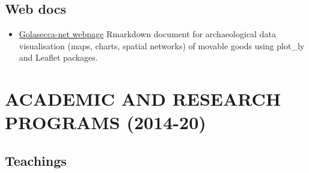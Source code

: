 \documentclass[11pt]{report} %
\begin{document}
\subsection*{Web docs}

\begin{itemize}
\item \href{https://zoometh.github.io/golasecca/}{Golasecca-net webpage} Rmarkdown document for archaeological data visualisation (maps, charts, spatial networks) of movable goods using plot\_ly and Leaflet packages.
\end{itemize}

\section*{ACADEMIC AND RESEARCH PROGRAMS (2014-20)}

\subsection*{Teachings}
\end{document}
